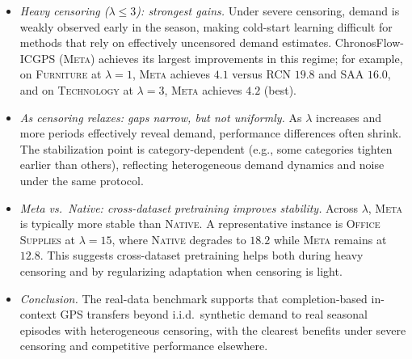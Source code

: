 \documentclass[11pt]{article}
\begin{document}
\begin{itemize}
\item 
\emph{Heavy censoring (\(\lambda\le 3\)): strongest gains.}
Under severe censoring, demand is weakly observed early in the season, making cold-start learning
difficult for methods that rely on effectively uncensored demand estimates. ChronosFlow-ICGPS
(\textsc{Meta}) achieves its largest improvements in this regime; for example, on \textsc{Furniture} at
\(\lambda=1\), \textsc{Meta} achieves \(4.1\) versus RCN \(19.8\) and SAA \(16.0\), and on
\textsc{Technology} at \(\lambda=3\), \textsc{Meta} achieves \(4.2\) (best).

\item
\emph{As censoring relaxes: gaps narrow, but not uniformly.}
As \(\lambda\) increases and more periods effectively reveal demand, performance differences often
shrink. The stabilization point is category-dependent (e.g., some categories tighten earlier than
others), reflecting heterogeneous demand dynamics and noise under the same protocol.

\item 
\emph{Meta vs.\ Native: cross-dataset pretraining improves stability.}
Across \(\lambda\), \textsc{Meta} is typically more stable than \textsc{Native}. A representative
instance is \textsc{Office Supplies} at \(\lambda=15\), where \textsc{Native} degrades to \(18.2\) while
\textsc{Meta} remains at \(12.8\). This suggests cross-dataset pretraining helps
both during heavy censoring and by regularizing adaptation when censoring is light.

\item 
\emph{Conclusion.}
The real-data benchmark supports that completion-based in-context GPS transfers beyond i.i.d.\ synthetic
demand to real seasonal episodes with heterogeneous censoring, with the clearest benefits under
severe censoring and competitive performance elsewhere.
\end{itemize}
\end{document}
